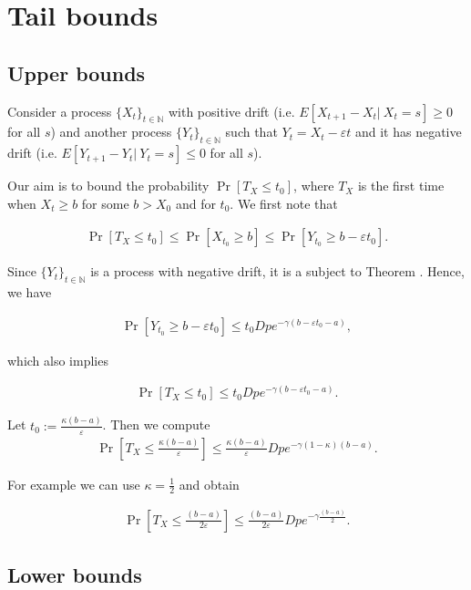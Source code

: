 \documentclass[12pt, a4paper]{article}
\theoremstyle{remark}
\begin{document}
\section{Tail bounds}
\subsection{Upper bounds}
Consider a process $\{X_t\}_{t \in \mathbb{N}}$ with positive drift (i.e. $E[X_{t + 1} - X_t |\ X_t = s] \geq 0$ for all $s$) and another process $\{Y_t\}_{t \in \mathbb{N}}$ such that $Y_t = X_t - \varepsilon t$ and it has negative drift (i.e. $E[Y_{t + 1} - Y_t |\ Y_t = s] \leq 0$ for all $s$).

Our aim is to bound the probability $\Pr[T_X \leq t_0]$, where $T_X$ is the first time when $X_t \geq b$ for some $b > X_0$ and for $t_0$. We first note that

\begin{align*}
    \Pr[T_X \leq t_0] \leq \Pr[X_{t_0} \geq b] \leq \Pr[Y_{t_0} \geq b - \varepsilon t_0].
\end{align*}

Since $\{Y_t\}_{t \in \mathbb{N}}$ is a process with negative drift, it is a subject to Theorem \cite{}. Hence, we have

\begin{align*}
    \Pr[Y_{t_0} \geq b - \varepsilon t_0] \leq t_0 D p e^{-\gamma(b - \varepsilon t_0 - a)},
\end{align*}

which also implies

\begin{align*}
    \Pr[T_X \leq t_0] \leq t_0 D p e^{-\gamma(b - \varepsilon t_0 - a)}.
\end{align*}

Let $t_0 := \frac{\kappa (b - a)}{\varepsilon}$. Then we compute
\begin{align*}
    \Pr\left[T_X \leq \frac{\kappa (b - a)}{\varepsilon}\right] \leq \frac{\kappa (b - a)}{\varepsilon} D p e^{-\gamma(1 - \kappa)(b - a)}.
\end{align*}

For example we can use $\kappa = \frac{1}{2}$ and obtain

\begin{align*}
    \Pr\left[T_X \leq \frac{(b - a)}{2\varepsilon}\right] \leq \frac{(b - a)}{2\varepsilon} D p e^{-\gamma\frac{(b - a)}{2}}.
\end{align*}

\subsection{Lower bounds}
\end{document}
